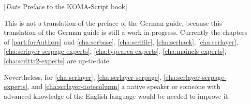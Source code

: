 %
%
%
%
%
%
%
%
%

                 [$Date$
                  Preface to the KOMA-Script book]



This is not a translation of the preface of the German \KOMAScript{} guide,
because this translation of the German \KOMAScript{} guide is still a work in
progress. Currently the chapters of \autoref{part:forAuthors} and
\autoref{cha:scrbase}, \autoref{cha:scrlfile}, \autoref{cha:scrhack},
\autoref{cha:scrlayer}, \autoref{cha:scrlayer-scrpage-experts},
\autoref{cha:typearea-experts}, \autoref{cha:maincls-experts},
\autoref{cha:scrlttr2-experts} are up-to-date.

Nevertheless, for \autoref{cha:scrlayer}, \autoref{cha:scrlayer-scrpage},
\autoref{cha:scrlayer-scrpage-experts}, and \autoref{cha:scrlayer-notecolumn}
a native speaker or someone with advanced knowledge of the English language
would be needed to improve it.

